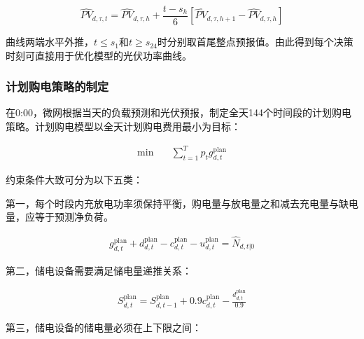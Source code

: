 \documentclass[UTF8]{ctexart}
\begin{document}
    \begin{equation}
        \widehat{PV}_{d,\tau,t}
        =\widehat{PV}_{d,\tau,h}
        +\frac{t-s_h}{6}
        \left[
        \widehat{PV}_{d,\tau,h+1}
        -\widehat{PV}_{d,\tau,h}
        \right]
    \end{equation}
    
    曲线两端水平外推，$t\leq s_1$和$t\geq s_{24}$时分别取首尾整点预报值。由此得到每个决策时刻可直接用于优化模型的光伏功率曲线。\par
    
    \subsubsection{计划购电策略的制定}
    
    在0:00，微网根据当天的负载预测和光伏预报，制定全天144个时间段的计划购电策略。计划购电模型以全天计划购电费用最小为目标：
    
    \begin{equation}
        \begin{aligned}
            \min\quad
            & \sum_{t=1}^{T}p_tg_{d,t}^{\mathrm{plan}}
        \end{aligned}
    \end{equation}
    
    约束条件大致可分为以下五类：\par
    
    第一，每个时段内充放电功率须保持平衡，购电量与放电量之和减去充电量与缺电量，应等于预测净负荷。
    
    \begin{equation}
        \begin{aligned}
            g_{d,t}^{\mathrm{plan}} + d_{d,t}^{\mathrm{plan}} - c_{d,t}^{\mathrm{plan}} - u_{d,t}^{\mathrm{plan}} = \widehat N_{d,t|0}
        \end{aligned}
    \end{equation}
    
    第二，储电设备需要满足储电量递推关系：
    
    \begin{equation}
        \begin{aligned}
            S_{d,t}^{\mathrm{plan}} = S_{d,t-1}^{\mathrm{plan}} + 0.9c_{d,t}^{\mathrm{plan}} - \frac{d_{d,t}^{\mathrm{plan}}}{0.9}
        \end{aligned}
    \end{equation}
    
    第三，储电设备的储电量必须在上下限之间：
    
\end{document}
